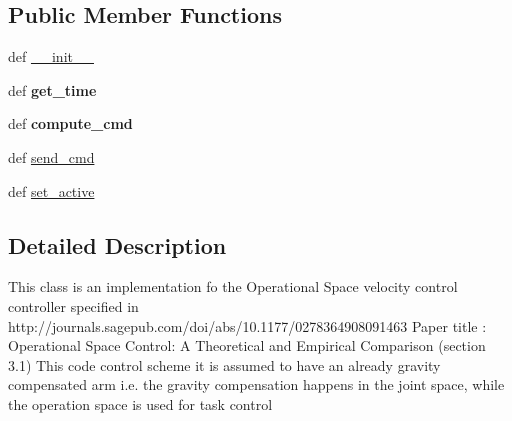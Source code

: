 \subsection*{Public Member Functions}
\begin{DoxyCompactItemize}
\item 
def \hyperlink{classaml__ctrl_1_1controllers_1_1os__controllers_1_1os__velocity__controller_1_1_o_s_velocity_controller_a2fb1750695088e028a61aa6b06006b7e}{\-\_\-\-\_\-init\-\_\-\-\_\-}
\item 
\hypertarget{classaml__ctrl_1_1controllers_1_1os__controllers_1_1os__velocity__controller_1_1_o_s_velocity_controller_a67c40896c4ff97e01876067c7f0227fc}{def {\bfseries get\-\_\-time}}\label{classaml__ctrl_1_1controllers_1_1os__controllers_1_1os__velocity__controller_1_1_o_s_velocity_controller_a67c40896c4ff97e01876067c7f0227fc}

\item 
\hypertarget{classaml__ctrl_1_1controllers_1_1os__controllers_1_1os__velocity__controller_1_1_o_s_velocity_controller_a258538858a45d152856b74c978b77b24}{def {\bfseries compute\-\_\-cmd}}\label{classaml__ctrl_1_1controllers_1_1os__controllers_1_1os__velocity__controller_1_1_o_s_velocity_controller_a258538858a45d152856b74c978b77b24}

\item 
def \hyperlink{classaml__ctrl_1_1controllers_1_1os__controllers_1_1os__velocity__controller_1_1_o_s_velocity_controller_a972ac1575f218b3c77d144190d4daf13}{send\-\_\-cmd}
\item 
def \hyperlink{classaml__ctrl_1_1controllers_1_1os__controllers_1_1os__velocity__controller_1_1_o_s_velocity_controller_ac09e229dbbb04fcb80f4d8b8e12cb2e8}{set\-\_\-active}
\end{DoxyCompactItemize}


\subsection{Detailed Description}
\begin{DoxyVerb}This class is an implementation fo the Operational Space velocity control 
controller specified in http://journals.sagepub.com/doi/abs/10.1177/0278364908091463
Paper title : Operational Space Control: A Theoretical and Empirical Comparison (section 3.1)
This code control scheme it is assumed to have an already gravity compensated arm
i.e. the gravity compensation happens in the joint space, while the operation space is used for task control
\end{DoxyVerb}
 

